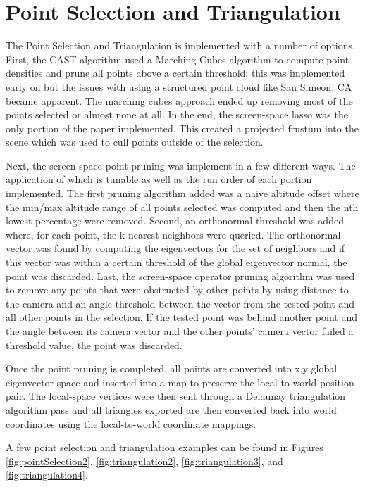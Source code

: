 \section{Point Selection and Triangulation}

The Point Selection and Triangulation is implemented with a number of options.
First, the CAST algorithm used a Marching Cubes algorithm to compute point
densities and prune all points above a certain threshold; this was implemented
early on but the issues with using a structured point cloud like San Simeon, CA
became apparent. The marching cubes approach ended up removing most of the
points selected or almost none at all. In the end, the screen-space lasso was
the only portion of the paper implemented. This created a projected frustum into
the scene which was used to cull points outside of the selection.

Next, the screen-space point pruning was implement in a few different ways. The
application of which is tunable as well as the run order of each portion
implemented. The first pruning algorithm added was a naive altitude offset where
the min/max altitude range of all points selected was computed and then the nth
lowest percentage were removed. Second, an orthonormal threshold was added
where, for each point, the k-nearest neighbors were queried. The orthonormal
vector was found by computing the eigenvectors for the set of neighbors and if
this vector was within a certain threshold of the global eigenvector normal, the
point was discarded. Last, the screen-space operator pruning algorithm was used
to remove any points that were obstructed by other points by using distance to
the camera and an angle threshold between the vector from the tested point and
all other points in the selection. If the tested point was behind another point
and the angle between its camera vector and the other points’ camera vector
failed a threshold value, the point was discarded.

Once the point pruning is completed, all points are converted into x,y global
eigenvector space and inserted into a map to preserve the local-to-world
position pair. The local-space vertices were then sent through a Delaunay
triangulation algorithm pass and all triangles exported are then converted back
into world coordinates using the local-to-world coordinate mappings.

A few point selection and triangulation examples can be found in Figures
\ref{fig:pointSelection2}, \ref{fig:triangulation2}, \ref{fig:triangulation3},
and \ref{fig:triangulation4}.

